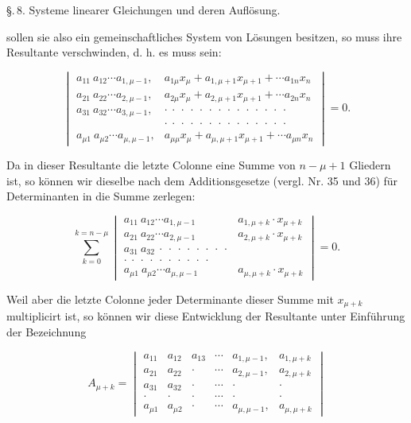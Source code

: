 \documentclass[11pt]{article}
\providecommand{\weberpage}[1]{}
\providecommand{\weq}[2]{\begin{equation}\tag{#1}#2\end{equation}}
\begin{document}
\weberpage{111}
\noindent \S.\,8. Systeme linearer Gleichungen und deren Aufl\"osung.

sollen sie also ein gemeinschaftliches System von L\"osungen besitzen, so muss ihre Resultante verschwinden, d. h. es muss sein:

\weq{III}{
\begin{vmatrix}
a_{11}\ a_{12}\cdots a_{1,\mu-1}, & a_{1\mu}x_\mu + a_{1,\mu+1}x_{\mu+1}+\cdots a_{1n}x_n \\
a_{21}\ a_{22}\cdots a_{2,\mu-1}, & a_{2\mu}x_\mu + a_{2,\mu+1}x_{\mu+1}+\cdots a_{2n}x_n \\
a_{31}\ a_{32}\cdots a_{3,\mu-1}, & \cdot\ \cdot\ \cdot\ \cdot\ \cdot\ \cdot\ \cdot\ \cdot\ \cdot\ \cdot\ \cdot\ \cdot\ \cdot\ \cdot \\
& \cdot\ \cdot\ \cdot\ \cdot\ \cdot\ \cdot\ \cdot\ \cdot\ \cdot\ \cdot\ \cdot\ \cdot\ \cdot\ \cdot \\
a_{\mu 1}\ a_{\mu 2}\cdots a_{\mu,\mu-1}, & a_{\mu\mu}x_\mu + a_{\mu,\mu+1}x_{\mu+1}+\cdots a_{\mu n}x_n
\end{vmatrix}=0.
}

Da in dieser Resultante die letzte Colonne eine Summe von $n-\mu+1$ Gliedern ist, so k\"onnen wir dieselbe nach dem Additionsgesetze (vergl. Nr. 35 und 36) f\"ur Determinanten in die Summe zerlegen:

\[
\sum_{k=0}^{k=n-\mu}
\begin{vmatrix}
a_{11}\ a_{12}\cdots a_{1,\mu-1} & a_{1,\mu+k}\cdot x_{\mu+k} \\
a_{21}\ a_{22}\cdots a_{2,\mu-1} & a_{2,\mu+k}\cdot x_{\mu+k} \\
a_{31}\ a_{32}\ \cdot\ \cdot\ \cdot\ \cdot\ \cdot\ \cdot\ \cdot\ \cdot & \\
\cdot\ \cdot\ \cdot\ \cdot\ \cdot\ \cdot\ \cdot\ \cdot\ \cdot\ \cdot & \\
a_{\mu 1}\ a_{\mu 2}\cdots a_{\mu,\mu-1} & a_{\mu,\mu+k}\cdot x_{\mu+k}
\end{vmatrix}=0.
\]

Weil aber die letzte Colonne jeder Determinante dieser Summe mit $x_{\mu+k}$ multiplicirt ist, so k\"onnen wir diese Entwicklung der Resultante unter Einf\"uhrung der Bezeichnung

\[
A_{\mu+k}=
\begin{vmatrix}
a_{11} & a_{12} & a_{13} & \cdots & a_{1,\mu-1}, & a_{1,\mu+k} \\
a_{21} & a_{22} & \cdot & \cdots & a_{2,\mu-1}, & a_{2,\mu+k} \\
a_{31} & a_{32} & \cdot & \cdots & \cdot & \cdot \\
\cdot & \cdot & \cdot & \cdots & \cdot & \cdot \\
a_{\mu 1} & a_{\mu 2} & \cdot & \cdots & a_{\mu,\mu-1}, & a_{\mu,\mu+k}
\end{vmatrix}
\]
\end{document}
